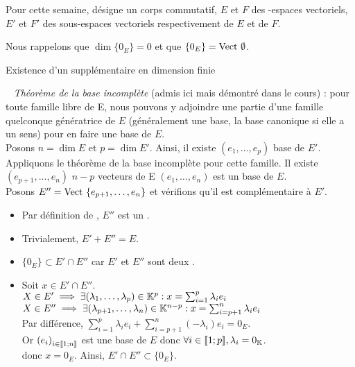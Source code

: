 \documentclass{article}
\date{22 Avril 2024}
\begin{document}
	\maketitle
	
	Pour cette semaine, \K désigne un corps commutatif, $E$ et $F$ des \K\!\!-espaces vectoriels, $E'$ et $F'$ des sous-espaces vectoriels respectivement de $E$ et de $F$.
	
	Nous rappelons que $\dim \{0_E\} = 0$ et que $\{0_E\} = \text{Vect } \emptyset$.
	
	\begin{question_kholle}
		{Existence d'un supplémentaire en dimension finie}
		
		~\newline
		\textit{Théorème de la base incomplète} (admis ici mais démontré dans le cours) : pour toute famille libre de E, nous pouvons y adjoindre une partie d'une famille quelconque génératrice de $E$ (généralement une base, la base canonique si elle a un sens) pour en faire une base de $E$. \\
		
		Posons $n = \dim E$ et $p = \dim E'$. Ainsi, il existe $(e_1, \ldots, e_p)$ base de $E'$. \\
		Appliquons le théorème de la base incomplète pour cette famille. Il existe $(e_{p+1}, \ldots, e_n)$ $n-p$ vecteurs de E \tq $(e_1, \ldots, e_n)$ est un base de $E$. \\
		Posons $E'' = \text{Vect } \{ e_{p+1}, \ldots, e_n \}$ et vérifions qu'il est complémentaire à $E'$.
		
		\begin{itemize}[label=$*$]
			\item Par définition de \Vect\!\!, $E''$ est un \sev.
			\item Trivialement, $E' + E'' = E$.
			\item $\{0_E\} \subset E' \cap E''$ car $E'$ et $E''$ sont deux \sevs.
			\item Soit $x \in E' \cap E''$. \\
			$X \in E' \implies \exists (\lambda_1, \ldots, \lambda_p) \in \mathbb K^p : x = \sum_{i=1}^{p} \lambda_i e_i$ \\
			$X \in E'' \implies \exists (\lambda_{p+1}, \ldots, \lambda_n) \in \mathbb K^{n-p} : x = \sum_{i=p+1}^{n} \lambda_i e_i$ \\
			Par différence, $\sum_{i=1}^{p} \lambda_i e_i + \sum_{i=p+1}^{n} \left(-\lambda_i\right) e_i = 0_E$. \\
			Or $\left(e_i\right)_{i \in [\![ 1 ; n ]\!]}$ est une base de $E$ donc $\forall i \in [\![ 1 ; p ]\!], \lambda_i = 0_{\mathbb K}$. \\
			donc $x = 0_E$.
			Ainsi, $E' \cap E'' \subset \{0_E\}$.
		\end{itemize}
	\end{question_kholle}
	
\end{document}
